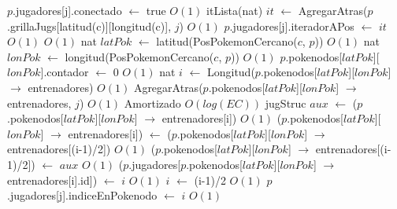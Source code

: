 \begin{Algoritmos}
\begin{algorithm}[H]
\begin{algorithmic}[1]
\State $p$.jugadores[\hspace{0.5mm}j\hspace{0.5mm}].conectado $\gets$ true \Comment $O(1)$
\State itLista(nat) $it$ $\gets$ AgregarAtras($p$.grillaJugs[latitud(c)][longitud(c)], $j$) \Comment $O(1)$
\State $p$.jugadores[j].iteradorAPos $\gets$ $it$ \Comment $O(1)$
 \Comment $O(1)$
	\State nat $latPok$ $\gets$ latitud(PosPokemonCercano($c$, $p$)) \Comment $O(1)$
	\State nat $lonPok$ $\gets$ longitud(PosPokemonCercano($c$, $p$)) \Comment $O(1)$
	\State $p$.pokenodos[$latPok$][$lonPok$].contador $\gets$ 0 \Comment $O(1)$
	\State nat $i$ $\gets$ Longitud($p$.pokenodos[$latPok$][$lonPok$] $\to$ entrenadores) \Comment $O(1)$
	\State AgregarAtras($p$.pokenodos[$latPok$][$lonPok$] $\to$ entrenadores, $j$) \Comment $O(1)$ Amortizado
	 \Comment $O(log(EC))$
		\State jugStruc $aux$ $\gets$ ($p$.pokenodos[$latPok$][$lonPok$] $\to$ entrenadores[i]) \Comment $O(1)$
		\State ($p$.pokenodos[$latPok$][$lonPok$] $\to$ entrenadores[i]) $\gets$ \newline
		($p$.pokenodos[$latPok$][$lonPok$] $\to$ entrenadores[(i-1)/2]) \Comment $O(1)$
		\State ($p$.pokenodos[$latPok$][$lonPok$] $\to$ entrenadores[(i-1)/2]) $\gets$ $aux$ \Comment $O(1)$
		\State ($p$.jugadores[$p$.pokenodos[$latPok$][$lonPok$] $\to$ entrenadores[i].id]) $\gets$ $i$ \Comment $O(1)$
		\State $i$ $\gets$ (i-1)/2 \Comment $O(1)$
	\EndWhile
	\State $p$.jugadores[j].indiceEnPokenodo $\gets$ $i$ \Comment $O(1)$
\EndIf


\end{algorithmic}
\end{algorithm}
\end{Algoritmos}
